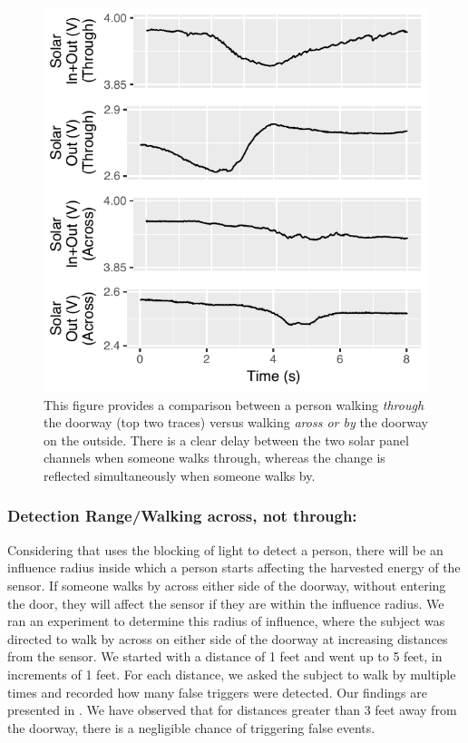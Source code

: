 \begin{figure}[t]
    \includegraphics[width=\columnwidth]{figs/acrossAndLinger.pdf}
    \caption{ This figure provides a comparison between a person walking \textit{through} the doorway (top two traces) versus walking \textit{aross or by} the doorway on the outside. There is a clear delay between the two solar panel channels when someone walks through, whereas the change is reflected simultaneously when someone walks by.}
    \label{fig:across}
\end{figure}

\subsubsection{Detection Range/Walking across, not through:}
\label{subsubsec:range}
Considering that \sysname uses the blocking of light to detect a person, there will be an influence radius inside which a person starts affecting the harvested energy of the sensor.
If someone walks by across either side of the doorway, without entering the door, they will affect the sensor if they are within the influence radius.
We ran an experiment to determine this radius of influence, where the subject was directed to walk by across on either side of the doorway at increasing distances from the sensor.
We started with a distance of 1 feet and went up to 5 feet, in increments of 1 feet.
For each distance, we asked the subject to walk by multiple times and recorded how many false triggers were detected.
Our findings are presented in .
We have observed that for distances greater than 3 feet away from the doorway, there is a negligible chance of triggering false events.

